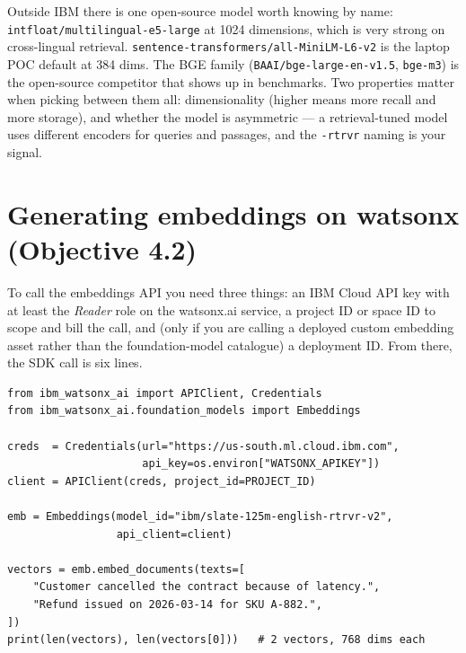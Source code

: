 Outside IBM there is one open-source model worth knowing by name: \texttt{intfloat/multilingual-e5-large} at 1024 dimensions, which is very strong on cross-lingual retrieval. \texttt{sentence-transformers/all-MiniLM-L6-v2} is the laptop POC default at 384 dims. The BGE family (\texttt{BAAI/bge-large-en-v1.5}, \texttt{bge-m3}) is the open-source competitor that shows up in benchmarks. Two properties matter when picking between them all: dimensionality (higher means more recall and more storage), and whether the model is asymmetric --- a retrieval-tuned model uses different encoders for queries and passages, and the \texttt{-rtrvr} naming is your signal.


\section{Generating embeddings on watsonx (Objective 4.2)}

To call the embeddings API you need three things: an IBM Cloud API key with at least the \emph{Reader} role on the watsonx.ai service, a project ID or space ID to scope and bill the call, and (only if you are calling a deployed custom embedding asset rather than the foundation-model catalogue) a deployment ID. From there, the SDK call is six lines.

\begin{examplebox}[title=\textbf{Get embeddings via the watsonx Python SDK}]
\begin{lstlisting}[style=pythonstyle]
from ibm_watsonx_ai import APIClient, Credentials
from ibm_watsonx_ai.foundation_models import Embeddings

creds  = Credentials(url="https://us-south.ml.cloud.ibm.com",
                     api_key=os.environ["WATSONX_APIKEY"])
client = APIClient(creds, project_id=PROJECT_ID)

emb = Embeddings(model_id="ibm/slate-125m-english-rtrvr-v2",
                 api_client=client)

vectors = emb.embed_documents(texts=[
    "Customer cancelled the contract because of latency.",
    "Refund issued on 2026-03-14 for SKU A-882.",
])
print(len(vectors), len(vectors[0]))   # 2 vectors, 768 dims each
\end{lstlisting}
\end{examplebox}

